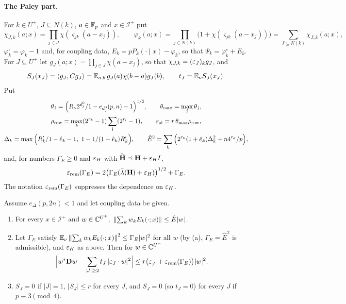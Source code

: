 \paragraph{The Paley part.}
For $k\in U^+$, $J\subseteq N(k)$, $a\in\mathbb F_p$ and $x\in\mathcal I^+$ put
\[
  \chi_{J,k}(a;x)=\prod_{j\in J}\chi(\varsigma_{jk}(a-x_j)),\qquad
  \varphi_k(a;x)=\prod_{j\in N(k)}\big(1+\chi(\varsigma_{jk}(a-x_j))\big)
  =\sum_{J\subseteq N(k)}\chi_{J,k}(a;x),
\]
$\varphi^\circ_k=\varphi_k-1$ and, for coupling data, $E_k=pP_k(\cdot\mid x)-\varphi_k$, so
that $\Psi_k=\varphi^\circ_k+E_k$. For $J\subseteq U^+$ let
$g_J(a;x)=\prod_{j\in J}\chi(a-x_j)$, so that $\chi_{J,k}=(\varepsilon_J)_kg_J$, and
\[
  S_J(x_J)=\left\langle g_J,Cg_J\right\rangle=\mathbb E_{a,b}\,g_J(a)\chi(b-a)g_J(b),\qquad t_J=\mathbb E_\nu S_J(x_J).
\]
Put
\begin{gather*}
  \theta_j=\Big(R_\nu2^{d^0_j}/1-e_{d^0_j}(p,n)-1\Big)^{1/2},\qquad
  \theta_{\max}=\max_j\theta_j,\\
  \rho_{\rm row}=\max_k(2^{r_k}-1)\sum_l(2^{r_l}-1),\qquad
  \varepsilon_{\ne}=r\,\theta_{\max}\rho_{\rm row},\\
  \Delta_k=\max\Big(R'_k/1-\hat e_k-1,\ 1-1/(1+\hat e_k)R'_k\Big),\qquad
  \hat E^2=\sum_k\Big(2^{r_k}(1+\hat e_k)\Delta_k^2+n4^{r_k}/p\Big),
\end{gather*}
and, for numbers $\Gamma_E\ge0$ and $\varepsilon_H$ with $\widetilde{\mathbf H}\preceq\mathbf H+\varepsilon_HI$,
\begin{equation}\label{eq:spec:rem}
  \varepsilon_{\rm rem}(\Gamma_E)=2\big(\Gamma_E(\bar\lambda(\mathbf H)+\varepsilon_H)\big)^{1/2}+\Gamma_E .
\end{equation}
The notation $\varepsilon_{\rm rem}(\Gamma_E)$ suppresses the dependence on $\varepsilon_H$.

\begin{lemma}\label{lem:spec2:paley}
Assume $e_\Delta(p,2n)<1$ and let coupling data be given.
\begin{enumerate}[label=\textup{(\alph*)}]
\item For every $x\in\mathcal I^+$ and $w\in\mathbb C^{U^+}$,
  $\left\|\sum_kw_kE_k(\cdot;x)\right\|\le\hat E|w|$.
\item Let $\Gamma_E$ satisfy $\mathbb E_\nu\left\|\sum_kw_kE_k(\cdot;x)\right\|^2\le\Gamma_E|w|^2$ for all $w$
  (by (a), $\Gamma_E=\hat E^2$ is admissible), and $\varepsilon_H$ as above. Then for
  $w\in\mathbb C^{U^+}$
  \[
    \Big|w^*\mathbf Dw-\sum_{|J|\ge2}t_J\,|\varepsilon_J\cdot w|^2\Big|\le r\big(\varepsilon_{\ne}+\varepsilon_{\rm rem}(\Gamma_E)\big)|w|^2 .
  \]
\item $S_J=0$ if $|J|=1$, $|S_J|\le r$ for every $J$, and $S_J=0$ (so $t_J=0$)
  for every $J$ if $p\equiv3\pmod4$.
\end{enumerate}
\end{lemma}

